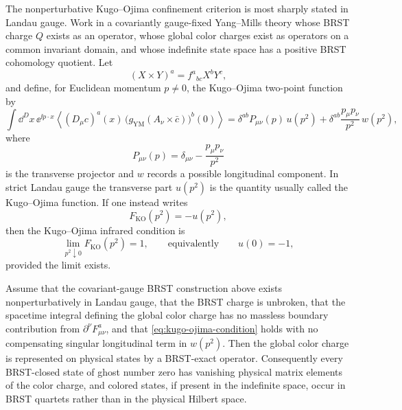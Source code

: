 The nonperturbative Kugo--Ojima confinement criterion is most sharply stated
in Landau gauge.  Work in a covariantly gauge-fixed Yang--Mills theory whose
BRST charge \(Q\) exists as an operator, whose global color charges exist as
operators on a common invariant domain, and whose indefinite state space has a
positive BRST cohomology quotient.  Let
\[
  (X\times Y)^a=f^a{}_{bc}X^bY^c ,
\]
and define, for Euclidean momentum \(p\ne0\), the Kugo--Ojima two-point
function by
\begin{equation}
  \int \dd^D x\,\ee^{\ii p\cdot x}
  \left\langle
    (D_\mu c)^a(x)\,
    \bigl(g_{\mathrm{YM}}(A_\nu\times\bar c)\bigr)^b(0)
  \right\rangle
  =
  \delta^{ab}P_{\mu\nu}(p)\,u(p^2)
  +
  \delta^{ab}\frac{p_\mu p_\nu}{p^2}\,w(p^2),
  \label{eq:kugo-ojima-two-point-function}
\end{equation}
where
\[
  P_{\mu\nu}(p)=\delta_{\mu\nu}-\frac{p_\mu p_\nu}{p^2}
\]
is the transverse projector and \(w\) records a possible longitudinal
component.  In strict Landau gauge the transverse part \(u(p^2)\) is the
quantity usually called the Kugo--Ojima function.  If one instead writes
\[
  F_{\mathrm{KO}}(p^2)=-u(p^2),
\]
then the Kugo--Ojima infrared condition is
\begin{equation}
  \lim_{p^2\downarrow0}F_{\mathrm{KO}}(p^2)=1,
  \qquad\text{equivalently}\qquad
  u(0)=-1 ,
  \label{eq:kugo-ojima-condition}
\end{equation}
provided the limit exists.

\begin{conjecture}
\label{conj:kugo-ojima-confinement}
Assume that the covariant-gauge BRST construction above exists
nonperturbatively in Landau gauge, that the BRST charge is unbroken, that the
spacetime integral defining the global color charge has no massless
boundary contribution from \(\partial^\nu F_{\mu\nu}^a\), and that
\eqref{eq:kugo-ojima-condition} holds with no compensating singular
longitudinal term in \(w(p^2)\).  Then the global color charge is represented
on physical states by a BRST-exact operator.  Consequently every BRST-closed
state of ghost number zero has vanishing physical matrix elements of the
color charge, and colored states, if present in the indefinite space, occur in
BRST quartets rather than in the physical Hilbert space.
\end{conjecture}

